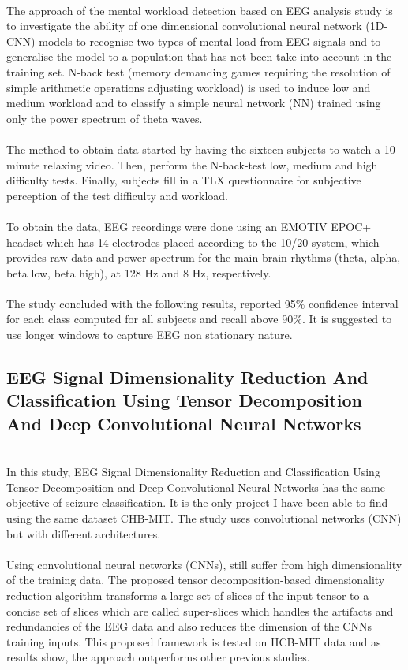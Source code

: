 \leavevmode\\
The approach of the mental workload detection based on EEG analysis study is to investigate the ability of one dimensional convolutional neural network (1D-CNN)\cite{CNN} models to recognise two types of mental load from EEG signals and to generalise the model to a population that has not been take into account in the training set. N-back test (memory demanding games requiring the resolution of simple arithmetic operations adjusting workload) is used to induce low and medium workload and to classify a simple neural network (NN) trained using only the power spectrum of theta waves.
\\\\
The method to obtain data started by having the sixteen subjects to watch a 10-minute relaxing video. Then, perform the N-back-test low, medium and high difficulty tests. Finally, subjects fill in a TLX questionnaire for subjective perception of the test difficulty and workload.
\\\\
To obtain the data, EEG recordings were done using an EMOTIV EPOC+ headset which has 14 electrodes placed according to the 10/20 system, which provides raw data and power spectrum for the main brain rhythms (theta, alpha, beta low, beta high), at 128 Hz and 8 Hz, respectively. 
\\\\
The study concluded with the following results, reported 95\% confidence interval for each class computed for all subjects and recall above 90\%. It is suggested to use longer windows to capture EEG non stationary nature.
\\


\subsection{EEG Signal Dimensionality Reduction And Classification Using Tensor Decomposition And Deep Convolutional Neural Networks}
\leavevmode\\
In this study, EEG Signal Dimensionality Reduction and Classification Using Tensor Decomposition and Deep Convolutional Neural Networks\cite{relatedwork1} has the same objective of seizure classification. It is the only project I have been able to find using the same dataset CHB-MIT. The study uses convolutional networks (CNN) but with different architectures.
\\\\
Using convolutional neural networks (CNNs), still suffer from high dimensionality of the training data. The proposed tensor decomposition-based dimensionality reduction algorithm transforms a large set of slices of the input tensor to a concise set of slices which are called super-slices which handles the artifacts and redundancies of the EEG data and also reduces the dimension of the CNNs training inputs. This proposed framework is tested on HCB-MIT data and as results show, the approach outperforms other previous studies.
\\


